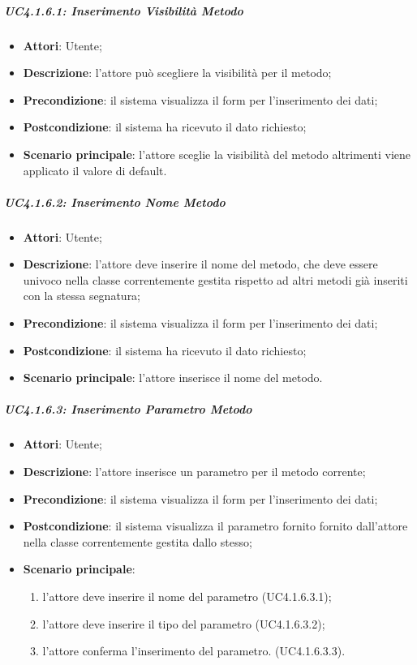 \subparagraph{UC4.1.6.1: Inserimento Visibilità Metodo}
\label{UC4.1.6.1}
\begin{itemize}
\item \textbf{Attori}: Utente;
\item \textbf{Descrizione}: l'attore può scegliere la visibilità per il metodo;
\item \textbf{Precondizione}: il sistema visualizza il form per l'inserimento dei dati;
\item \textbf{Postcondizione}: il sistema ha ricevuto il dato richiesto;
\item \textbf{Scenario principale}:
l'attore sceglie la visibilità del metodo altrimenti viene applicato il valore di default.
\end{itemize}

\subparagraph{UC4.1.6.2: Inserimento Nome Metodo}
\label{UC4.1.6.2}
\begin{itemize}
\item \textbf{Attori}: Utente;
\item \textbf{Descrizione}: l'attore deve inserire il nome del metodo, che deve essere univoco nella classe correntemente gestita rispetto ad altri metodi già inseriti con la stessa segnatura;
\item \textbf{Precondizione}: il sistema visualizza il form per l'inserimento dei dati;
\item \textbf{Postcondizione}: il sistema ha ricevuto il dato richiesto;
\item \textbf{Scenario principale}:
l'attore inserisce il nome del metodo.
\end{itemize}

\subparagraph{UC4.1.6.3: Inserimento Parametro Metodo}
\label{UC4.1.6.3}
\begin{itemize}
\item \textbf{Attori}: Utente;
\item \textbf{Descrizione}: l'attore inserisce un parametro per il metodo corrente;
\item \textbf{Precondizione}: il sistema visualizza il form per l'inserimento dei dati;
\item \textbf{Postcondizione}: il sistema visualizza il parametro fornito fornito dall'attore nella classe correntemente gestita dallo stesso;
\item \textbf{Scenario principale}:
\begin{enumerate}
	\item l'attore deve inserire il nome del parametro (UC4.1.6.3.1);
	\item l'attore deve inserire il tipo del parametro (UC4.1.6.3.2);
	\item l'attore conferma l'inserimento del parametro. (UC4.1.6.3.3).
\end{enumerate}
\end{itemize}

